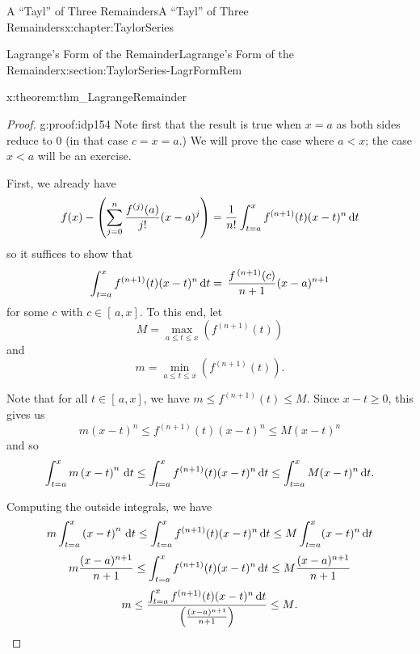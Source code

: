 \begin{chapterptx}{A ``Tayl'' of Three Remainders}{}{A ``Tayl'' of Three Remainders}{}{}{x:chapter:TaylorSeries}
\begin{sectionptx}{Lagrange's Form of the Remainder}{}{Lagrange's Form of the Remainder}{}{}{x:section:TaylorSeries-LagrFormRem}
\begin{theorem}{}{}{x:theorem:thm_LagrangeRemainder}
		\end{theorem}
		\begin{proof}{}{g:proof:idp154}
			Note first that the result is true when \(x=a\) as both sides reduce to 0 (in that case \(c=x=a\).) We will prove the case where \(a\lt x\); the case \(x\lt a\) will be an exercise.%
			\par
			First, we already have%
			\begin{equation*}
				f(x)-\left(\sum_{j=0}^n\frac{f^{(j)}(a)}{j!}(x-a)^j\right)=\frac{1}{n!} \int_{t=a}^xf^{(n+1)}(t)(x-t)^n\,{\rm d} t
			\end{equation*}
			so it suffices to show that%
			\begin{equation*}
				\int_{t=a}^xf^{(n+1)}(t)(x-t)^n\,{\rm d} t=\,\frac{f^{\,(n+1)}(c)}{n+1}(x-a)^{n+1}
			\end{equation*}
			for some \(c\) with \(c\in[\,a,x]\). To this end, let%
			\begin{equation*}
				M=\max_{a\le t\le x}\left(f^{(n+1)}(t)\right)
			\end{equation*}
			and%
			\begin{equation*}
				m=\min_{a\le t\le x}\left(f^{(n+1)}(t)\right)\text{.}
			\end{equation*}
			\par
			Note that for all \(t\in[\,a,x]\), we have \(m\leq f^{(n+1)}(t)\leq M\). Since \(x-t\geq 0\), this gives us%
			\begin{equation}
				m\left(x-t\right)^n\leq f^{(n+1)}(t)(x-t)^n\leq M(x-t)^n\label{x:men:eq_LagRem1}
			\end{equation}
			and so%
			\begin{equation}
				\int_{t=a}^xm\left(x-t\right)^n\,{\rm d} t\leq\int_{t=a}^xf^{(n+1)}(t)(x-t)^n\,{\rm d} t\leq \int_{t=a}^xM(x-t)^n\,{\rm d} t\text{.}\label{x:men:eq_LagRem2}
			\end{equation}
			\par
			Computing the outside integrals, we have%
			\begin{equation*}
				m\int_{t=a}^x\left(x-t\right)^n\,{\rm d} t\leq\int_{t=a}^xf^{(n+1)}(t)(x-t)^n\,{\rm d} t\leq M\int_{t=a}^x(x-t)^n\,{\rm d} t
			\end{equation*}
			\begin{equation}
				m\frac{(x-a)^{n+1}}{n+1}\leq\int_{t=a}^xf^{(n+1)}(t)(x-t)^n\,{\rm d} t\leq M\frac{(x-a)^{n+1}}{n+1}\label{x:men:eq_LagRem3}
			\end{equation}
			\begin{equation*}
				m\leq\frac{\int_{t=a}^xf^{(n+1)}(t)(x-t)^n\dx{ t}}{\left(\frac{(x-a)^{n+1}}{n+1} \right)}\leq M\text{.}

\end{equation*}
\end{proof}
\end{sectionptx}
\end{chapterptx}
